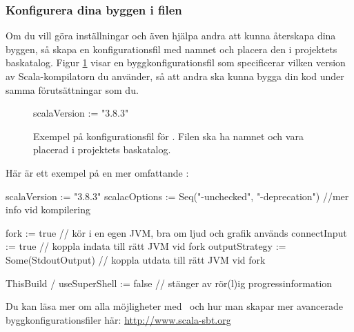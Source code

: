 \subsubsection{Konfigurera dina byggen i filen }

Om du vill göra inställningar och även hjälpa andra att kunna återskapa dina byggen, så skapa en konfigurationsfil med namnet  och placera den i projektets baskatalog. Figur \ref{fig:sbt:build-file} visar en byggkonfigurationsfil som specificerar vilken version av Scala-kompilatorn du använder, så att andra ska kunna bygga din kod under samma förutsättningar som du.

\begin{figure}[H]
\centering
\begin{Code}
scalaVersion := "3.8.3"
\end{Code}
\caption{Exempel på konfigurationsfil för \sbt. Filen ska ha namnet  och vara placerad i projektets baskatalog.}
\label{fig:sbt:build-file}
\end{figure}

\noindent Här är ett exempel på en mer omfattande :
\begin{CodeSmall}
scalaVersion   := "3.8.3"
scalacOptions  := Seq("-unchecked", "-deprecation") //mer info vid kompilering

fork           := true   // kör i en egen JVM, bra om ljud och grafik används 
connectInput   := true   // koppla indata till rätt JVM vid fork
outputStrategy := Some(StdoutOutput)  // koppla utdata till rätt JVM vid fork

ThisBuild / useSuperShell := false // stänger av rör(l)ig progressinformation
\end{CodeSmall}

\noindent Du kan läsa mer om alla möjligheter med \sbt\ och hur man skapar mer avancerade byggkonfigurationsfiler här: \url{http://www.scala-sbt.org}


